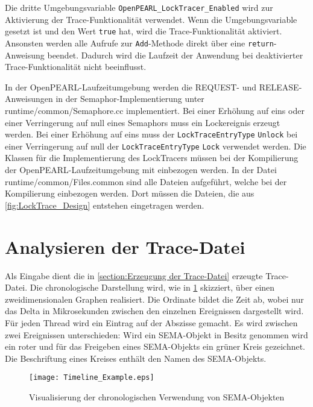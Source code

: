 Die dritte Umgebungsvariable \texttt{OpenPEARL\_LockTracer\_Enabled} wird zur
Aktivierung der Trace-Funktionalität verwendet. Wenn die Umgebungsvariable
gesetzt ist und den Wert \texttt{true} hat, wird die Trace-Funktionalität
aktiviert. Ansonsten werden alle Aufrufe zur \texttt{Add}-Methode direkt über
eine \texttt{return}-Anweisung beendet. Dadurch wird die Laufzeit der Anwendung
bei deaktivierter Trace-Funktionalität nicht beeinflusst.

In der OpenPEARL-Laufzeitumgebung werden die \textrm{REQUEST}- und
\textrm{RELEASE}-Anweisungen in der Semaphor-Implementierung unter
runtime/common/Semaphore.cc implementiert. Bei einer Erhöhung auf eins oder
einer Verringerung auf null eines Semaphors muss ein Lockereignis erzeugt
werden. Bei einer Erhöhung auf eins muss der \texttt{Lock\-Trace\-Entry\-Type}
\texttt{Unlock} bei einer Verringerung auf null der
\texttt{Lock\-Trace\-Entry\-Type} \texttt{Lock} verwendet werden. Die Klassen
für die Implementierung des LockTracers müssen bei der Kompilierung der
OpenPEARL-Laufzeitumgebung mit einbezogen werden. In der Datei
runtime/common/Files.common sind alle Dateien aufgeführt, welche bei der
Kompilierung einbezogen werden. Dort müssen die Dateien, die aus
\cref{fig:LockTrace_Design} entstehen eingetragen werden.

\section{Analysieren der Trace-Datei}
\label{section:Analysieren der Trace-Datei}
Als Eingabe dient die in \cref{section:Erzeugung der Trace-Datei} erzeugte
Trace-Datei. Die chronologische Darstellung wird, wie in
\cref{fig:Timeline_Example} skizziert, über einen zweidimensionalen Graphen
realisiert. Die Ordinate bildet die Zeit ab, wobei nur das Delta in
Mikrosekunden zwischen den einzelnen Ereignissen dargestellt wird. Für jeden
Thread wird ein Eintrag auf der Abszisse gemacht. Es wird zwischen zwei
Ereignissen unterschieden: Wird ein \textrm{SEMA-Objekt} in Besitz genommen wird
ein roter und für das Freigeben eines \textrm{SEMA-Objekts} ein grüner Kreis
gezeichnet. Die Beschriftung eines Kreises enthält den Namen des
\textrm{SEMA-Objekts}.
\begin{figure}[ht]
  \texttt{[image: Timeline\_Example.eps]}
  \caption{Visualisierung der chronologischen Verwendung von \textrm{SEMA-Objekten}}
  \label{fig:Timeline_Example}
\end{figure}

